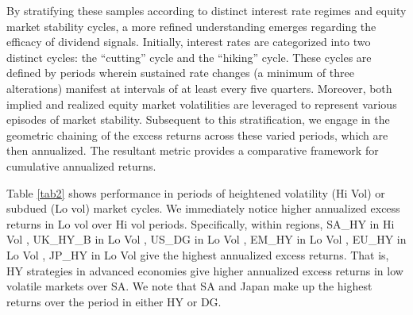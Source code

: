 \documentclass[12pt,preprint, authoryear]{elsarticle}
\numberwithin{equation}{section}
\numberwithin{figure}{section}
\numberwithin{table}{section}
\begin{document}
By stratifying these samples according to distinct interest rate regimes
and equity market stability cycles, a more refined understanding emerges
regarding the efficacy of dividend signals. Initially, interest rates
are categorized into two distinct cycles: the ``cutting'' cycle and the
``hiking'' cycle. These cycles are defined by periods wherein sustained
rate changes (a minimum of three alterations) manifest at intervals of
at least every five quarters. Moreover, both implied and realized equity
market volatilities are leveraged to represent various episodes of
market stability. Subsequent to this stratification, we engage in the
geometric chaining of the excess returns across these varied periods,
which are then annualized. The resultant metric provides a comparative
framework for cumulative annualized returns.

Table \ref{tab2} shows performance in periods of heightened volatility
(Hi Vol) or subdued (Lo vol) market cycles. We immediately notice higher
annualized excess returns in Lo vol over Hi vol periods. Specifically,
within regions, SA\_HY in Hi Vol , UK\_HY\_B in Lo Vol , US\_DG in Lo
Vol , EM\_HY in Lo Vol , EU\_HY in Lo Vol , JP\_HY in Lo Vol give the
highest annualized excess returns. That is, HY strategies in advanced
economies give higher annualized excess returns in low volatile markets
over SA. We note that SA and Japan make up the highest returns over the
period in either HY or DG.
\end{document}
